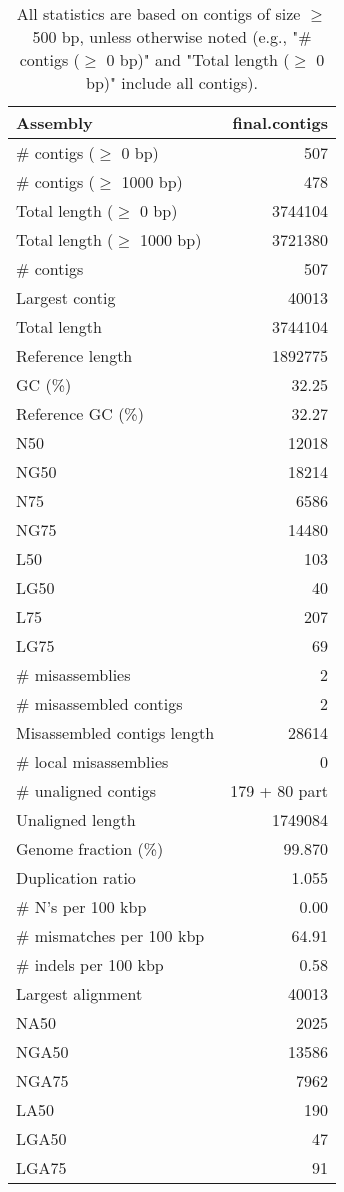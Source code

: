 \documentclass[12pt,a4paper]{article}
\begin{document}
\begin{table}[ht]
\begin{center}
\caption{All statistics are based on contigs of size $\geq$ 500 bp, unless otherwise noted (e.g., "\# contigs ($\geq$ 0 bp)" and "Total length ($\geq$ 0 bp)" include all contigs).}
\begin{tabular}{|l*{1}{|r}|}
\hline
Assembly & final.contigs \\ \hline
\# contigs ($\geq$ 0 bp) & 507 \\ \hline
\# contigs ($\geq$ 1000 bp) & 478 \\ \hline
Total length ($\geq$ 0 bp) & 3744104 \\ \hline
Total length ($\geq$ 1000 bp) & 3721380 \\ \hline
\# contigs & 507 \\ \hline
Largest contig & 40013 \\ \hline
Total length & 3744104 \\ \hline
Reference length & 1892775 \\ \hline
GC (\%) & 32.25 \\ \hline
Reference GC (\%) & 32.27 \\ \hline
N50 & 12018 \\ \hline
NG50 & 18214 \\ \hline
N75 & 6586 \\ \hline
NG75 & 14480 \\ \hline
L50 & 103 \\ \hline
LG50 & 40 \\ \hline
L75 & 207 \\ \hline
LG75 & 69 \\ \hline
\# misassemblies & 2 \\ \hline
\# misassembled contigs & 2 \\ \hline
Misassembled contigs length & 28614 \\ \hline
\# local misassemblies & 0 \\ \hline
\# unaligned contigs & 179 + 80 part \\ \hline
Unaligned length & 1749084 \\ \hline
Genome fraction (\%) & 99.870 \\ \hline
Duplication ratio & 1.055 \\ \hline
\# N's per 100 kbp & 0.00 \\ \hline
\# mismatches per 100 kbp & 64.91 \\ \hline
\# indels per 100 kbp & 0.58 \\ \hline
Largest alignment & 40013 \\ \hline
NA50 & 2025 \\ \hline
NGA50 & 13586 \\ \hline
NGA75 & 7962 \\ \hline
LA50 & 190 \\ \hline
LGA50 & 47 \\ \hline
LGA75 & 91 \\ \hline
\end{tabular}
\end{center}
\end{table}
\end{document}
